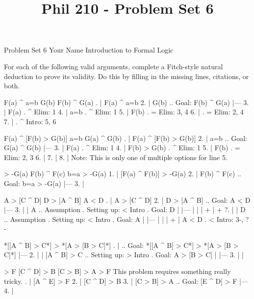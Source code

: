 
\title{Phil 210 - Problem Set 6}

\heading
Problem Set 6
Your Name
Introduction to Formal Logic
\endheading

For each of the following valid arguments, complete a Fitch-style natural deduction to prove its validity. Do this by filling in the missing lines, citations, or both.

\problems
{}
\argument
 F(a) ^ a=b
 G(b)
\argumentline
 F(b) ^ G(a)
\endargument
	\answer
	. | F(a) ^ a=b
	 2. | G(b)         ..  Goal: F(b) ^ G(a)
	    |---
	 3. | F(a)         .  ^ Elim: 1
	 4. | a=b          .  ^ Elim: 1
	 5. | F(b)         .  = Elim: 3, 4
	 6. |              .  = Elim: 2, 4
	 7. |              .  ^ Intro: 5, 6
	\endfitchproof
	\endanswer

\argument
 F(a) ^ [F(b) > G(b)]
 a=b
\argumentline
 G(a) ^ G(b)
\endargument
	\answer
	. | F(a) ^ [F(b) > G(b)]
	 2. | a=b          ..  Goal: G(a) ^ G(b)
	    |---
	 3. | F(a)         .  ^ Elim: 1
	 4. | F(b) > G(b)  .  ^ Elim: 1
	 5. | F(b)         .  = Elim: 2, 3
	 6. | 
	 7. | 
	 8. | 
	\endfitchproof
	\endanswer
Note: This is only one of multiple options for line 5.

\argument
 [F(a) ^ F(b)] > -G(a)
 F(b) ^ F(c)
\argumentline
 b=a > -G(a)
\endargument
	\answer
	\fitchproofindentby{-4\fitchspace}
	 1. | [F(a) ^ F(b)] > -G(a)
	 2. | F(b) ^ F(c)    ..  Goal: b=a > -G(a)
	    |---
	 3. | 
	\endfitchproof
	\endanswer

\argument
 A > [C ^ D]
 D > [A ^ B]
\argumentline
 A < D
\endargument
	\answer
	. | A > [C ^ D]
	 2. | D > [A ^ B]  ..  Goal: A < D
	    |---
	 3. |   | A        ..  Assumption  .  Setting up: < Intro  .  Goal: D
	    |   |---
	    |   | 
	    |   +
	    |   +
	 ?. |   | D        ..  Assumption  .  Setting up: < Intro  .  Goal: A
	    |   |---
	    |   | 
	    |   +
	    | A < D        .  < Intro: 3-, ?-
	\endfitchproof
	\endanswer

\argument
\argumentline
 *[[A ^ B] > C*] > *[A > [B > C]*]
\endargument
	\answer
	. |                    ..  Goal: *[[A ^ B] > C*] > *[A > [B > C]*]
	    |---
	 2. |   | [A ^ B] > C    ..  Setting up: > Intro  .  Goal: A > [B > C]
	    |   |---
	 3. |   | 
	\endfitchproof
	\endanswer

\argument
 [A ^ E] > F
 [C ^ D] > B
 [C > B] > A
\argumentline
 [E ^ D] > F
\endargument
\Hint This problem requires something really tricky.
	\answer
	. | [A ^ E] > F
	 2. | [C ^ D] > B
	 3. | [C > B] > A  ..  Goal: [E ^ D] > F
	    |---
	 4. | 
	\endfitchproof
	\endanswer

\endproblems
\bye
